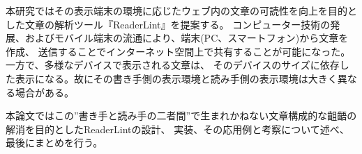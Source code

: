 \begin{jabstract}

    本研究ではその表示端末の環境に応じたウェブ内の文章の可読性を向上を目的とした文章の解析ツール『ReaderLint』を提案する。
    コンピューター技術の発展、およびモバイル端末の流通により、端末(PC、スマートフォン)から文章を作成、
    送信することでインターネット空間上で共有することが可能になった。一方で、多様なデバイスで表示される文章は、
    そのデバイスのサイズに依存した表示になる。故にその書き手側の表示環境と読み手側の表示環境は大きく異なる場合がある。
    

    本論文ではこの”書き手と読み手の二者間”で生まれかねない文章構成的な齟齬の解消を目的としたReaderLintの設計、
    実装、その応用例と考察について述べ、最後にまとめを行う。

\end{jabstract}


